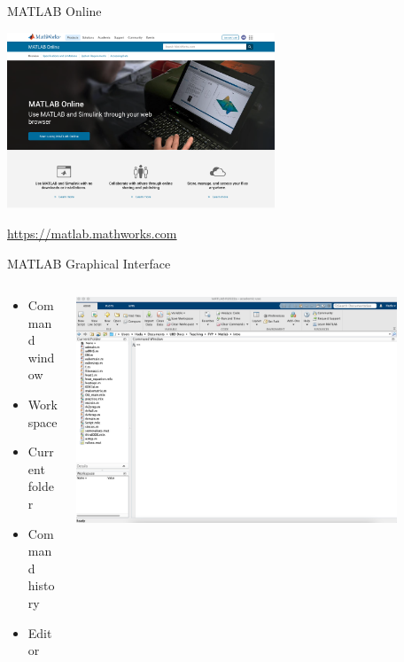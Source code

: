 \documentclass[,aspectratio=169]{beamer}
\begin{document}
\begin{frame}{MATLAB Online}
\begin{center}
	\includegraphics[width=0.6\textwidth]{matlab_online}
\end{center}
\url{https://matlab.mathworks.com}
\end{frame}



\begin{frame}{MATLAB Graphical Interface}
\begin{columns}
\begin{column}[T]{0.35\textwidth}
\begin{itemize}
	\item Command window
	\item Workspace
	\item Current folder
	\item Command history
	\item Editor
	\end{itemize}
\end{column}
\begin{column}[T]{0.75\textwidth}
	\includegraphics[width=0.85\textwidth]{initial_matlab}
\end{column}
\end{columns}

\end{frame}
\end{document}
